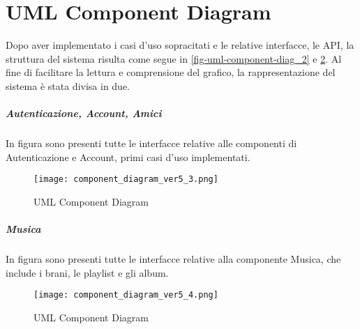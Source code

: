 \section{UML Component Diagram}
Dopo aver implementato i casi d'uso sopracitati e le relative interfacce, le API, la struttura del 
sistema risulta come segue in \ref{fig-uml-component-diag_2} e \ref{fig-uml-component-diag_4}. Al fine di
facilitare la lettura e comprensione del grafico, la rappresentazione del sistema è stata divisa in due. 
\subparagraph{Autenticazione, Account, Amici} In figura sono presenti tutte le interfacce
relative alle componenti di Autenticazione e Account, primi casi d'uso implementati.
\begin{figure}[H]
    \centering
    \texttt{[image: component\_diagram\_ver5\_3.png]}
    \caption{UML Component Diagram}
    \label{fig-uml-component-diag_3}
\end{figure}

\newpage
\subparagraph{Musica}  In figura sono presenti tutte le interfacce
relative alla componente Musica, che include i brani, le playlist e gli album.
\begin{figure}[H]
    \centering
    \texttt{[image: component\_diagram\_ver5\_4.png]}
    \caption{UML Component Diagram}
    \label{fig-uml-component-diag_4}
\end{figure}


